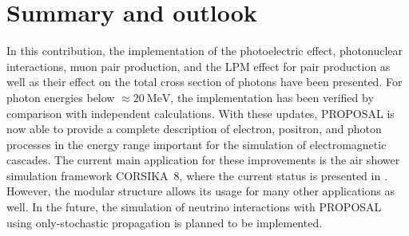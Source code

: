 \section{Summary and outlook}

In this contribution, the implementation of the photoelectric effect, photonuclear interactions, muon pair production, and the LPM effect for pair production as well as their effect on the total cross section of photons have been presented.
For photon energies below $\approx \SI{20}{\mega\electronvolt}$, the implementation has been verified by comparison with independent calculations. 
With these updates, PROPOSAL is now able to provide a complete description of electron, positron, and photon processes in the energy range important for the simulation of electromagnetic cascades.
The current main application for these improvements is the air shower simulation framework CORSIKA~8, where the current status is presented in \cite{icrc2023}.
However, the modular structure allows its usage for many other applications as well.
In the future, the simulation of neutrino interactions with PROPOSAL using only-stochastic propagation is planned to be implemented.